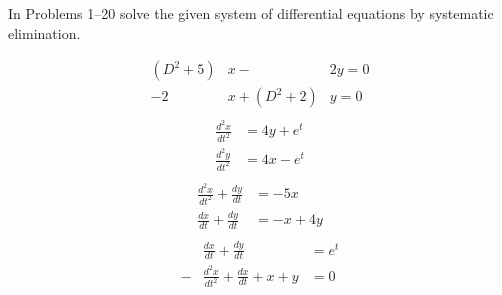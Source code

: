 \documentclass[chapter=7,section=6]{math252homework}
\begin{document}
In Problems 1--20 solve the given system of differential equations by systematic elimination.
\begin{problems}[start=5]
	\problem \begin{equation*}
	\begin{aligned}
	(D^{2}+5)&x - &2y = 0\\
			-2&x + (D^{2} + 2)&y = 0\\
	\end{aligned}
	\end{equation*}
	\setcounter{problemsi}{6}
	\problem \begin{equation*}
	\begin{aligned}
		\frac{d^{2}x}{dt^{2}} &= 4y + e^{t}\\
		\frac{d^{2}y}{dt^{2}} &= 4x - e^{t}\\
	\end{aligned}
	\end{equation*}
	\problem \begin{equation*}
	\begin{aligned}
		\frac{d^{2}x}{dt^{2}} + \frac{dy}{dt} &= -5x\\
		\frac{dx}{dt} + \frac{dy}{dt} &= -x + 4y\\
	\end{aligned}
	\end{equation*}
	\setcounter{problemsi}{13}
	\problem \begin{equation*}
	\begin{aligned}
		&\frac{dx}{dt} + \frac{dy}{dt}		&= e^{t}\\
		-&\frac{d^{2}x}{dt^{2}} + \frac{dx}{dt}	+ x + y	&= 0\\
	\end{aligned}
	\end{equation*}
\end{problems}
\end{document}

